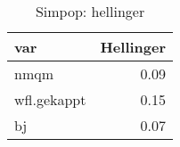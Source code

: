 \begin{table}[ht]
\centering
\begin{tabular}{lr}
  \hline
var & Hellinger \\ 
  \hline
nmqm & 0.09 \\ 
  wfl.gekappt & 0.15 \\ 
  bj & 0.07 \\ 
   \hline
\end{tabular}
\caption{Simpop: hellinger} 
\end{table}
